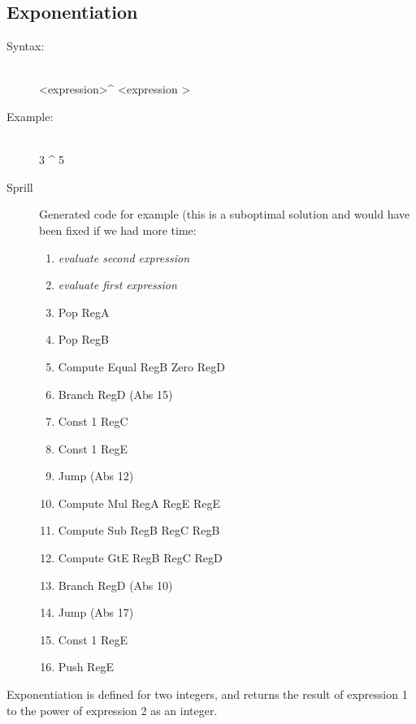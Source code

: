 \documentclass[10pt,a4paper]{report}
\begin{document}
\subsection{Exponentiation}
\begin{description}
	\item[Syntax:] \hfill \\ 
		\textless expression\textgreater \^{} \textless expression \textgreater
	\item[Example:] \hfill \\
		3 \^{} 5
	\item[Sprill] Generated code for example (this is a suboptimal solution and would have been fixed if we had more time:
		\begin{enumerate}
			\item \emph{evaluate second expression}
			\item \emph{evaluate first expression}
			\item Pop RegA
			\item Pop RegB
			\item Compute Equal RegB Zero RegD
			\item Branch RegD (Abs 15)
			\item Const 1 RegC
			\item Const 1 RegE
			\item Jump (Abs 12)
			\item Compute Mul RegA RegE RegE
			\item Compute Sub RegB RegC RegB
			\item Compute GtE RegB RegC RegD
			\item Branch RegD (Abs 10)
			\item Jump (Abs 17)
			\item Const 1 RegE
			\item Push RegE
		\end{enumerate}
\end{description}
Exponentiation is defined for two integers, and returns the result of expression 1 to the power of expression 2 as an integer.
\end{document}
